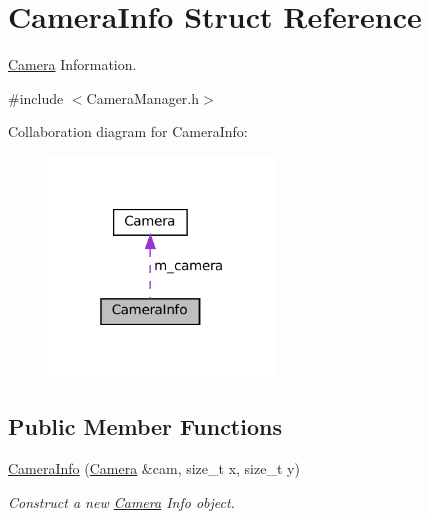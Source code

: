 \hypertarget{structCameraInfo}{}\section{Camera\+Info Struct Reference}
\label{structCameraInfo}


\hyperlink{classCamera}{Camera} Information.  




{\ttfamily \#include $<$Camera\+Manager.\+h$>$}



Collaboration diagram for Camera\+Info\+:\nopagebreak
\begin{figure}[H]
\begin{center}
\leavevmode
\includegraphics[width=172pt]{structCameraInfo__coll__graph}
\end{center}
\end{figure}
\subsection*{Public Member Functions}
\begin{DoxyCompactItemize}
\item 
\hyperlink{structCameraInfo_acaeb61d27869ecca978751caf05b4e22}{Camera\+Info} (\hyperlink{classCamera}{Camera} \&cam, size\+\_\+t x, size\+\_\+t y)
\begin{DoxyCompactList}\small\item\em Construct a new \hyperlink{classCamera}{Camera} Info object. \end{DoxyCompactList}\end{DoxyCompactItemize}
